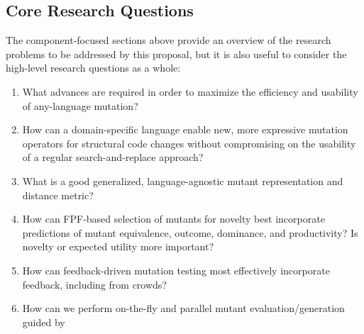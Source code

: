


\subsection{Core Research Questions}

The component-focused sections above provide an overview of the
research problems to be addressed by this proposal, but it is also
useful to consider the high-level research questions as a whole:


\begin{enumerate}[labelsep=3pt,leftmargin=12pt]
\item What advances are required in order to maximize the efficiency
  and usability of any-language mutation?
\item How can a domain-specific language
enable new, more expressive mutation operators for
structural code changes
without compromising on the usability of a %
regular
search-and-replace approach?
\item What is a good generalized, language-agnostic mutant representation
  and distance metric?
\item How can FPF-based selection of mutants for novelty best incorporate
  predictions of mutant equivalence, outcome, dominance, and
  productivity?  Is novelty or expected utility more important?
\item How can feedback-driven mutation testing most effectively
  incorporate feedback, including from crowds?
\item How can we perform on-the-fly and parallel mutant evaluation/generation guided by

\end{enumerate}
